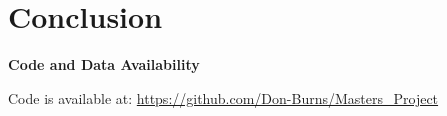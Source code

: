 \documentclass[a4paper, 11pt, hidelinks]{article} %
\begin{document}
\section{Conclusion}
	\linenumbers
	
	
	
	\nolinenumbers
	
	\textbf{Code and Data Availability}

	Code is available at: \url{https://github.com/Don-Burns/Masters_Project}
	
	
	\newpage
	\linenumbers
	
	
	\printbibliography
	
	\nolinenumbers
	
	
	\newpage
	
	
	
\end{document}
